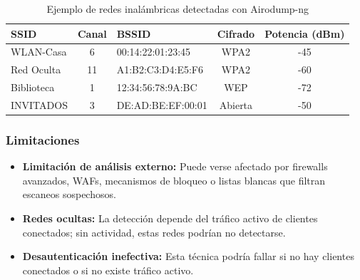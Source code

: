 \documentclass[a4paper, 11pt]{article}
\begin{document}
\vspace{1em}

\begin{table}[H]
\centering
\renewcommand{\arraystretch}{1.2}
\begin{tabular}{|l|c|l|c|c|}
\hline
\textbf{SSID} & \textbf{Canal} & \textbf{BSSID} & \textbf{Cifrado} & \textbf{Potencia (dBm)} \\
\hline
WLAN-Casa     & 6      & 00:14:22:01:23:45 & WPA2 & -45 \\
Red Oculta    & 11     & A1:B2:C3:D4:E5:F6 & WPA2 & -60 \\
Biblioteca    & 1      & 12:34:56:78:9A:BC & WEP      & -72 \\
INVITADOS     & 3      & DE:AD:BE:EF:00:01 & Abierta  & -50 \\
\hline
\end{tabular}
\caption{Ejemplo de redes inalámbricas detectadas con Airodump-ng}
\label{tab:redes_detectadas}
\end{table}
\subsubsection*{Limitaciones}

\begin{itemize}
    \item \textbf{Limitación de análisis externo:} Puede verse afectado por firewalls avanzados, WAFs, mecanismos de bloqueo o listas blancas que filtran escaneos sospechosos.
    
    \item \textbf{Redes ocultas:} La detección depende del tráfico activo de clientes conectados; sin actividad, estas redes podrían no detectarse.
    
    \item \textbf{Desautenticación inefectiva:} Esta técnica podría fallar si no hay clientes conectados o si no existe tráfico activo.
\end{itemize}

\par\vspace{0.5cm}
\end{document}
